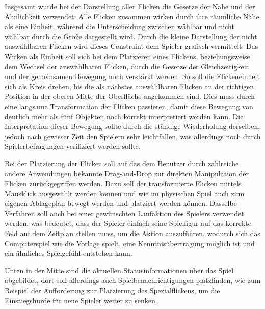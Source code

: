Insgesamt wurde bei der Darstellung aller Flicken die Gesetze der Nähe und der Ähnlichkeit verwendet: Alle Flicken zusammen wirken durch ihre räumliche Nähe als eine Einheit, während die Unterscheidung zwischen wählbar und nicht wählbar durch die Größe dargestellt wird. Durch die kleine Darstellung der nicht auswählbaren Flicken wird dieses Constraint dem Spieler grafisch vermittelt. Das Wirken als Einheit soll sich bei dem Platzieren eines Flickens, beziehungsweise dem Wechsel der auswählbaren Flicken, durch die Gesetze der Gleichzeitigkeit und der gemeinsamen Bewegung noch verstärkt werden. So soll die Flickeneinheit sich als Kreis drehen, bis die als nächstes auswählbaren Flicken an der richtigen Position in der oberen Mitte der Oberfläche angekommen sind. Dies muss durch eine langsame Transformation der Flicken passieren, damit diese Bewegung von deutlich mehr als fünf Objekten noch korrekt interpretiert werden kann. Die Interpretation dieser Bewegung sollte durch die ständige Wiederholung derselben, jedoch nach gewisser Zeit den Spielern sehr leichtfallen, was allerdings noch durch Spielerbefragungen verifiziert werden sollte.

Bei der Platzierung der Flicken soll auf das dem Benutzer durch zahlreiche andere Anwendungen bekannte Drag-and-Drop zur direkten Manipulation der Flicken zurückgegriffen werden. Dazu soll der transformierte Flicken mittels Mausklick ausgewählt werden können und wie im physischen Spiel auch zum eigenen Ablageplan bewegt werden und platziert werden können. Dasselbe Verfahren soll auch bei einer gewünschten Laufaktion des Spielers verwendet werden, was bedeutet, dass der Spieler einfach seine Spielfigur auf das korrekte Feld auf dem Zeitplan stellen muss, um die Aktion auszuführen, wodurch sich das Computerspiel wie die Vorlage spielt, eine Kenntnisübertragung möglich ist und ein ähnliches Spielgefühl entstehen kann.

\pagebreak

Unten in der Mitte sind die aktuellen Statusinformationen über das Spiel abgebildet, dort soll allerdings auch Spielbenachrichtigungen platzfinden, wie zum Beispiel der Aufforderung zur Platzierung des Spezialflickens, um die Einstiegshürde für neue Spieler weiter zu senken.

